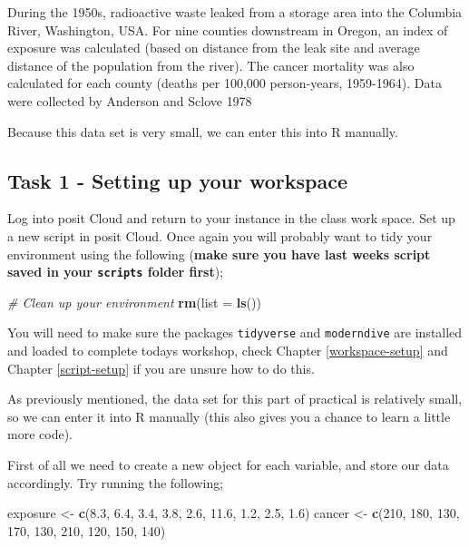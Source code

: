 \documentclass[
]{book}
\newenvironment{Shaded}{\begin{snugshade}}{\end{snugshade}}
\newcommand{\AttributeTok}[1]{\textcolor[rgb]{0.13,0.29,0.53}{#1}}
\newcommand{\CommentTok}[1]{\textcolor[rgb]{0.56,0.35,0.01}{\textit{#1}}}
\newcommand{\DecValTok}[1]{\textcolor[rgb]{0.00,0.00,0.81}{#1}}
\newcommand{\FloatTok}[1]{\textcolor[rgb]{0.00,0.00,0.81}{#1}}
\newcommand{\FunctionTok}[1]{\textcolor[rgb]{0.13,0.29,0.53}{\textbf{#1}}}
\newcommand{\NormalTok}[1]{#1}
\newcommand{\OtherTok}[1]{\textcolor[rgb]{0.56,0.35,0.01}{#1}}
\begin{document}
During the 1950s, radioactive waste leaked from a storage area into the Columbia River, Washington, USA. For nine counties downstream in Oregon, an index of exposure was calculated (based on distance from the leak site and average distance of the population from the river). The cancer mortality was also calculated for each county (deaths per 100,000 person-years, 1959-1964). Data were collected by Anderson and Sclove 1978

Because this data set is very small, we can enter this into R manually.

\hypertarget{manual-data-entry}{%
\subsection{Task 1 - Setting up your workspace}\label{manual-data-entry}}

Log into posit Cloud and return to your instance in the class work space. Set up a new script in posit Cloud. Once again you will probably want to tidy your environment using the following (\textbf{make sure you have last weeks script saved in your \texttt{scripts} folder first});

\begin{Shaded}
\begin{Highlighting}[]
\CommentTok{\# Clean up your environment}
\FunctionTok{rm}\NormalTok{(}\AttributeTok{list =} \FunctionTok{ls}\NormalTok{())}
\end{Highlighting}
\end{Shaded}

You will need to make sure the packages \texttt{tidyverse} and \texttt{moderndive} are installed and loaded to complete todays workshop, check Chapter \ref{workspace-setup} and Chapter \ref{script-setup} if you are unsure how to do this.

As previously mentioned, the data set for this part of practical is relatively small, so we can enter it into R manually (this also gives you a chance to learn a little more code).

First of all we need to create a new object for each variable, and store our data accordingly. Try running the following;

\begin{Shaded}
\begin{Highlighting}[]
\NormalTok{exposure }\OtherTok{\textless{}{-}} \FunctionTok{c}\NormalTok{(}\FloatTok{8.3}\NormalTok{, }\FloatTok{6.4}\NormalTok{, }\FloatTok{3.4}\NormalTok{, }\FloatTok{3.8}\NormalTok{, }\FloatTok{2.6}\NormalTok{, }\FloatTok{11.6}\NormalTok{, }\FloatTok{1.2}\NormalTok{, }\FloatTok{2.5}\NormalTok{, }\FloatTok{1.6}\NormalTok{)}
\NormalTok{cancer }\OtherTok{\textless{}{-}} \FunctionTok{c}\NormalTok{(}\DecValTok{210}\NormalTok{, }\DecValTok{180}\NormalTok{, }\DecValTok{130}\NormalTok{, }\DecValTok{170}\NormalTok{, }\DecValTok{130}\NormalTok{, }\DecValTok{210}\NormalTok{, }\DecValTok{120}\NormalTok{, }\DecValTok{150}\NormalTok{, }\DecValTok{140}\NormalTok{)}
\end{Highlighting}
\end{Shaded}
\end{document}
